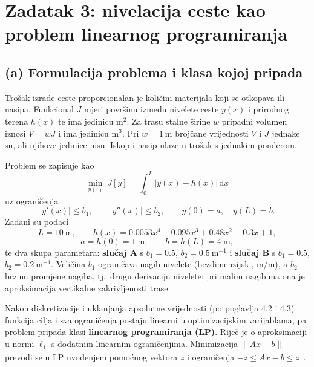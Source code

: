 \section{Zadatak 3: nivelacija ceste kao problem linearnog programiranja}

\subsection{(a) Formulacija problema i klasa kojoj pripada}

Trošak izrade ceste proporcionalan je količini materijala koji se otkopava ili nasipa. Funkcional $J$ mjeri površinu između nivelete ceste $y(x)$ i prirodnog terena $h(x)$ te ima jedinicu $\mathrm{m}^2$. Za trasu stalne širine $w$ pripadni volumen iznosi $V=wJ$ i ima jedinicu $\mathrm{m}^3$. Pri $w=1\ \mathrm{m}$ brojčane vrijednosti $V$ i $J$ jednake su, ali njihove jedinice nisu. Iskop i nasip ulaze u trošak s jednakim ponderom.

Problem se zapisuje kao
\begin{equation}
\min_{y(\cdot)} \ J[y] = \int_0^L \big| y(x) - h(x) \big| \, \mathrm{d}x
\label{eq:cesta_kont}
\end{equation}
uz ograničenja
\begin{equation}
|y'(x)| \leq b_1, \qquad |y''(x)| \leq b_2, \qquad y(0) = a, \quad y(L) = b .
\label{eq:cesta_kont_ogr}
\end{equation}
Zadani su podaci
\begin{equation}
L = 10 \ \mathrm{m}, \qquad h(x) = 0.0053 x^4 - 0.095 x^3 + 0.48 x^2 - 0.3 x + 1,
\end{equation}
\begin{equation}
a = h(0) = 1 \ \mathrm{m}, \qquad b = h(L) = 4 \ \mathrm{m},
\end{equation}
te dva skupa parametara: \textbf{slučaj A} s $b_1 = 0.5$, $b_2 = 0.5\ \mathrm{m}^{-1}$ i \textbf{slučaj B} s $b_1 = 0.5$, $b_2 = 0.2\ \mathrm{m}^{-1}$. Veličina $b_1$ ograničava nagib nivelete (bezdimenzijski, m/m), a $b_2$ brzinu promjene nagiba, tj.\ drugu derivaciju nivelete; pri malim nagibima ona je aproksimacija vertikalne zakrivljenosti trase.

Nakon diskretizacije i uklanjanja apsolutne vrijednosti (potpoglavlja 4.2 i 4.3) funkcija cilja i sva ograničenja postaju linearni u optimizacijskim varijablama, pa problem pripada klasi \textbf{linearnog programiranja (LP)}. Riječ je o aproksimaciji u normi $\ell_1$ s dodatnim linearnim ograničenjima. Minimizacija $\|Ax-b\|_1$ prevodi se u LP uvođenjem pomoćnog vektora $z$ i ograničenja $-z\leq Ax-b\leq z$~\cite[str.~5]{jokic2025vjezbe4}.

